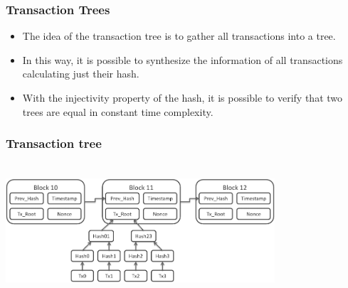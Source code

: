 \documentclass{beamer}
\begin{document}
\begin{frame}
   \frametitle{Transaction Trees}
   \begin{itemize}
     \item The idea of the transaction tree is to gather all transactions into a tree.
     \item In this way, it is possible to synthesize the information of all transactions
       calculating just their hash.
     \item With the injectivity property of the hash, it is possible to verify that two trees
       are equal in constant time complexity.
   \end{itemize}
\end{frame}

\begin{frame}
  \frametitle{Transaction tree}
    \includegraphics[width=10cm, height=5cm]{blockchain}
\end{frame}
\end{document}
